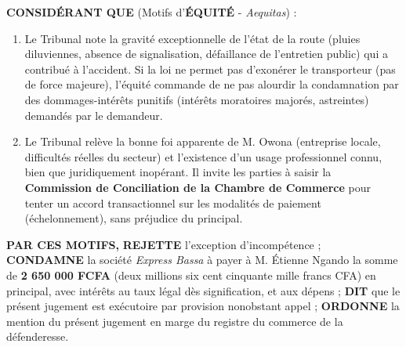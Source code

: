 \documentclass[11pt]{article}
\begin{document}
\begin{exoresolu}
\textbf{CONSIDÉRANT QUE} (Motifs d'\textbf{ÉQUITÉ} - \textit{Aequitas}) :
\begin{enumerate}
    \item Le Tribunal note la gravité exceptionnelle de l'état de la route (pluies diluviennes, absence de signalisation, défaillance de l'entretien public) qui a contribué à l'accident. Si la loi ne permet pas d'exonérer le transporteur (pas de force majeure), l'équité commande de ne pas alourdir la condamnation par des dommages-intérêts punitifs (intérêts moratoires majorés, astreintes) demandés par le demandeur.
    \item Le Tribunal relève la bonne foi apparente de M. Owona (entreprise locale, difficultés réelles du secteur) et l'existence d'un usage professionnel connu, bien que juridiquement inopérant. Il invite les parties à saisir la \textbf{Commission de Conciliation de la Chambre de Commerce} pour tenter un accord transactionnel sur les modalités de paiement (échelonnement), sans préjudice du principal.
\end{enumerate}

\textbf{PAR CES MOTIFS,}
\textbf{REJETTE} l'exception d'incompétence ;
\textbf{CONDAMNE} la société \textit{Express Bassa} à payer à M. Étienne Ngando la somme de \textbf{2 650 000 FCFA} (deux millions six cent cinquante mille francs CFA) en principal, avec intérêts au taux légal dès signification, et aux dépens ;
\textbf{DIT} que le présent jugement est exécutoire par provision nonobstant appel ;
\textbf{ORDONNE} la mention du présent jugement en marge du registre du commerce de la défenderesse.


\end{exoresolu}
\end{document}
